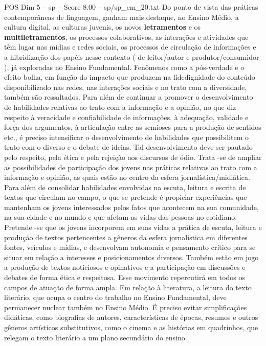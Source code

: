 \begin{textsample}{POS Dim 5 – sp – Score 8.00 – sp/sp\_em\_20.txt}
Do ponto de vista das práticas contemporâneas de linguagem, ganham mais destaque, no Ensino Médio, a cultura digital, as culturas juvenis, os novos \textbf{letramentos} e os \textbf{multiletramentos}, os processos colaborativos, as interações e atividades que têm lugar nas mídias e redes sociais, os processos de circulação de informações e a hibridização dos papéis nesse contexto ( de leitor/autor e produtor/consumidor ), já exploradas no Ensino Fundamental.
Fenômenos como a pós-verdade e o efeito bolha, em função do impacto que produzem na fidedignidade do conteúdo disponibilizado nas redes, nas interações sociais e no trato com a diversidade, também são ressaltados.
Para além de continuar a promover o desenvolvimento de habilidades relativas ao trato com a informação e a opinião, no que diz respeito à veracidade e confiabilidade de informações, à adequação, validade e força dos argumentos, à articulação entre as semioses para a produção de sentidos etc., é preciso intensificar o desenvolvimento de habilidades que possibilitem o trato com o diverso e o debate de ideias.
Tal desenvolvimento deve ser pautado pelo respeito, pela ética e pela rejeição aos discursos de ódio.
Trata -se de ampliar as possibilidades de participação dos jovens nas práticas relativas ao trato com a informação e opinião, as quais estão no centro da esfera jornalística/midiática.
Para além de consolidar habilidades envolvidas na escuta, leitura e escrita de textos que circulam no campo, o que se pretende é propiciar experiências que mantenham os jovens interessados pelos fatos que acontecem na sua comunidade, na sua cidade e no mundo e que afetam as vidas das pessoas no cotidiano.
Pretende -se que os jovens incorporem em suas vidas a prática de escuta, leitura e produção de textos pertencentes a gêneros da esfera jornalística em diferentes fontes, veículos e mídias, e desenvolvam autonomia e pensamento crítico para se situar em relação a interesses e posicionamentos diversos.
Também estão em jogo a produção de textos noticiosos e opinativos e a participação em discussões e debates de forma ética e respeitosa.
Esse movimento repercutirá em todos os campos de atuação de forma ampla.
Em relação à literatura, a leitura do texto literário, que ocupa o centro do trabalho no Ensino Fundamental, deve permanecer nuclear também no Ensino Médio.
É preciso evitar simplificações didáticas, como biografias de autores, características de épocas, resumos e outros gêneros artísticos substitutivos, como o cinema e as histórias em quadrinhos, que relegam o texto literário a um plano secundário do ensino.

\end{textsample}
